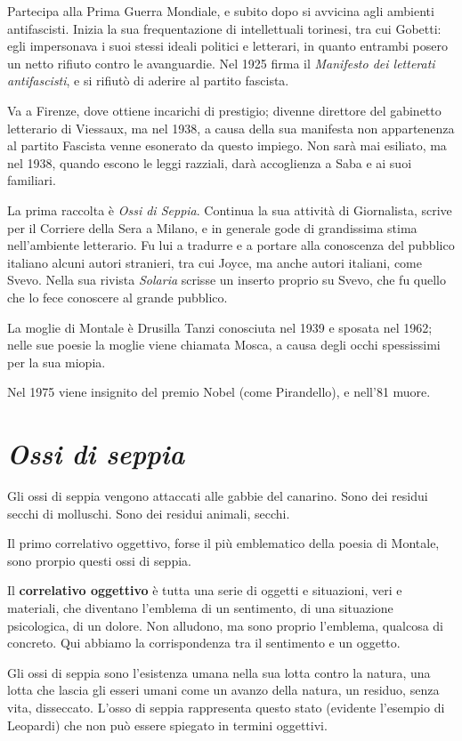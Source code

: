 Partecipa alla Prima Guerra Mondiale, e subito dopo si avvicina agli ambienti antifascisti. Inizia la sua frequentazione di intellettuali torinesi, tra cui Gobetti: egli impersonava i suoi stessi ideali politici e letterari, in quanto entrambi posero un netto rifiuto contro le avanguardie.
Nel 1925 firma il \textit{Manifesto dei letterati antifascisti}, e si rifiutò di aderire al partito fascista. 

Va a Firenze, dove ottiene incarichi di prestigio; divenne direttore del gabinetto letterario di Viessaux, ma nel 1938, a causa della sua manifesta non appartenenza al partito Fascista venne esonerato da questo impiego. Non sarà mai esiliato, ma nel 1938, quando escono le leggi razziali, darà accoglienza a Saba e ai suoi familiari.

La prima raccolta è \textit{Ossi di Seppia}. Continua la sua attività di Giornalista, scrive per il Corriere della Sera a Milano, e in generale gode di grandissima stima nell'ambiente letterario.
Fu lui a tradurre e a portare alla conoscenza del pubblico italiano alcuni autori stranieri, tra cui Joyce, ma anche autori italiani, come Svevo. Nella sua rivista \textit{Solaria} scrisse un inserto proprio su Svevo, che fu quello che lo fece conoscere al grande pubblico.

La moglie di Montale è Drusilla Tanzi conosciuta nel 1939 e sposata nel 1962; nelle sue poesie la moglie viene chiamata Mosca, a causa degli occhi spessissimi per la sua miopia.

Nel 1975 viene insignito del premio Nobel (come Pirandello), e nell'81 muore.

\section{\textit{Ossi di seppia}}

Gli ossi di seppia vengono attaccati alle gabbie del canarino. Sono dei residui secchi di molluschi. Sono dei residui animali, secchi.

Il primo correlativo oggettivo, forse il più emblematico della poesia di Montale, sono prorpio questi ossi di seppia.

Il \textbf{correlativo oggettivo} è tutta una serie di oggetti e situazioni, veri e materiali, che diventano l'emblema di un sentimento, di una situazione psicologica, di un dolore. Non alludono, ma sono proprio l'emblema, qualcosa di concreto. Qui abbiamo la corrispondenza tra il sentimento e un oggetto.

Gli ossi di seppia sono l'esistenza umana nella sua lotta contro la natura, una lotta che lascia gli esseri umani come un avanzo della natura, un residuo, senza vita, disseccato. L'osso di seppia rappresenta questo stato (evidente l'esempio di Leopardi) che non può essere spiegato in termini oggettivi.

